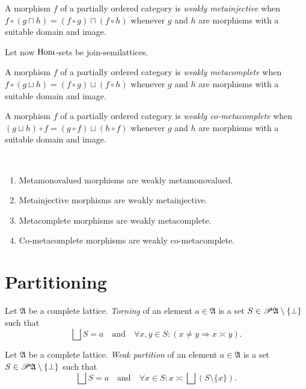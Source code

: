 \begin{defn}
A morphism $f$ of a partially
ordered category is \emph{weakly metainjective} when $f\circ(g\sqcap h)=(f\circ g)\sqcap(f\circ h)$
whenever $g$ and $h$ are morphisms with a suitable domain and image.
\end{defn}
Let now $\operatorname{Hom}$-sets be join-semilattices.
\begin{defn}
A morphism $f$ of a partially
ordered category is \emph{weakly metacomplete} when $f\circ(g\sqcup h)=(f\circ g)\sqcup(f\circ h)$
whenever $g$ and $h$ are morphisms with a suitable domain and image.
\end{defn}

\begin{defn}
A morphism $f$ of a partially
ordered category is \emph{weakly co-metacomplete} when $(g\sqcup h)\circ f=(g\circ f)\sqcup(h\circ f)$
whenever $g$ and $h$ are morphisms with a suitable domain and image.\end{defn}
\begin{obvious}
~
\begin{enumerate}
\item Metamonovalued morphisms are weakly metamonovalued.
\item Metainjective morphisms are weakly metainjective.
\item Metacomplete morphisms are weakly metacomplete.
\item Co-metacomplete morphisms are weakly co-metacomplete.
\end{enumerate}
\end{obvious}

\section{Partitioning}
\begin{defn}
Let $\mathfrak{A}$ be a complete lattice. \emph{Torning}
of an element $a\in\mathfrak{A}$ is a set $S\in\mathscr{P}\mathfrak{A}\setminus\{\bot\}$
such that
\[
\bigsqcup S=a\quad\text{and}\quad\forall x,y\in S:(x\neq y\Rightarrow x\asymp y).
\]

\end{defn}

\begin{defn}
Let $\mathfrak{A}$ be a complete lattice.
\emph{Weak partition} of an element $a\in\mathfrak{A}$ is a set $S\in\mathscr{P}\mathfrak{A}\setminus\{\bot\}$
such that
\[
\bigsqcup S=a\quad\text{and}\quad\forall x\in S:x\asymp\bigsqcup(S\setminus\{x\}).
\]

\end{defn}

